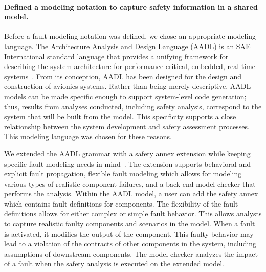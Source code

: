 \paragraph{Defined a modeling notation to capture safety information in a shared model.}
Before a fault modeling notation was defined, we chose an appropriate modeling language. The Architecture Analysis and Design Language (AADL) is an SAE International standard language that provides a unifying framework for describing the system architecture for performance-critical, embedded, real-time systems~\cite{AADL_Standard,FeilerModelBasedEngineering2012}. From its conception, AADL has been designed for the design and construction of avionics systems.  Rather than being merely descriptive, AADL models can be made specific enough to support system-level code generation; thus, results from analyses conducted, including safety analysis, correspond to the system that will be built from the model.  This specificity supports a close relationship between the system development and safety assessment processes. This modeling language was chosen for these reasons. 

We extended the AADL grammar with a safety annex extension while keeping specific fault modeling needs in mind~\cite{Stewart17:IMBSA, stewart2020safety}. The extension supports behavioral and explicit fault propagation, flexible fault modeling which allows for modeling various types of realistic component failures, and a back-end model checker that performs the analysis.  Within the AADL model, a user can add the safety annex which contains fault definitions for components. The flexibility of the fault definitions allows for either complex or simple fault behavior. This allows analysts to capture realistic faulty components and scenarios in the model. When a fault is activated, it modifies the output of the component. This faulty behavior may lead to a violation of the contracts of other components in the system, including assumptions of downstream components. The model checker analyzes the impact of a fault when the safety analysis is executed on the extended model.


